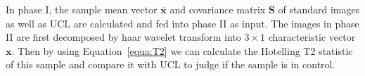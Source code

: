 In phase I, the sample mean vector $\overline{\mathbf{x}}$ and covariance matrix $\mathbf{S}$ of standard images as well as UCL are calculated and fed into phase II as input. The images in phase II are first decomposed by haar wavelet transform into $3 \times 1$ characteristic vector $\mathbf{x}$. Then by using Equation~\ref{equa:T2} we can calculate the Hotelling T2 statistic of this sample and compare it with UCL to judge if the sample is in control.









